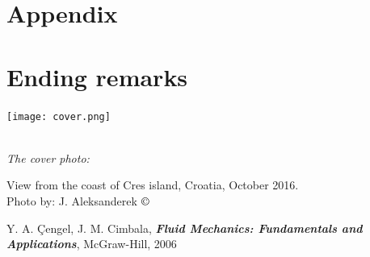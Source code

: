 \documentclass[10pt]{report}
\begin{document}


\chapter*{Appendix}

\newpage
\thispagestyle{empty}

\chapter*{Ending remarks}



\begin{flushright}


\texttt{[image: cover.png]}

\setlength{\parskip}{0.1em}
\setlength{\parindent}{0cm}
\ \\[0.5cm]
\textit{The cover photo:}  

View from the coast of Cres island, Croatia, October 2016.
\ \\[0.1cm]
Photo by: J. Aleksanderek $\copyright$
\end{flushright}




\begin{thebibliography}{50}

\item Y. A. Çengel, J. M. Cimbala, \textbf{\textit{Fluid Mechanics: Fundamentals and Applications}}, McGraw-Hill, 2006
\item
\item
\item
\item
\item 

\item 
\item
\item
\item
\item
\item 

\item 
\item
\item
\item
\item
\item 
\thispagestyle{empty}
\end{thebibliography}
\end{document}

